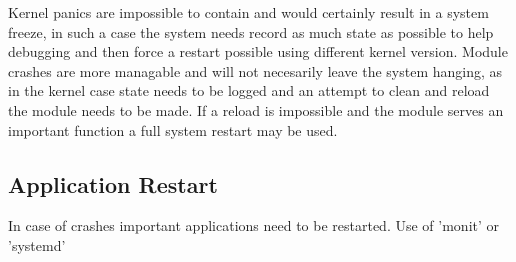 Kernel panics are impossible to contain and would certainly result in a system freeze, in such a case the system needs record as much state as possible to help debugging and then force a restart possible using different kernel version. Module crashes are more managable and will not necesarily leave the system hanging, as in the kernel case state needs to be logged and an attempt to clean and reload the module needs to be made. If a reload is impossible and the module serves an important function a full system restart may be used.

\subsection{Application Restart}

In case of crashes important applications need to be restarted. Use of 'monit' or 'systemd'
